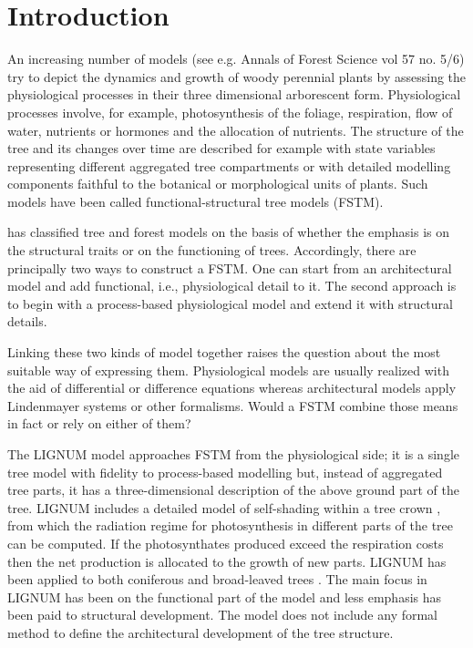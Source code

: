 \section{Introduction} An increasing number of models (see e.g. Annals
of Forest  Science vol  57 no.   5/6) try to  depict the  dynamics and
growth  of  woody  perennial  plants by  assessing  the  physiological
processes in their  three dimensional arborescent form.  Physiological
processes  involve,  for   example,  photosynthesis  of  the  foliage,
respiration, flow  of water, nutrients or hormones  and the allocation
of nutrients.  The structure of the tree and its changes over time are
described  for  example with  state  variables representing  different
aggregated  tree compartments  or with  detailed  modelling components
faithful  to the  botanical or  morphological units  of  plants.  Such
models have been called functional-structural tree models (FSTM).

\citet{kurth:94b} has  classified tree and forest models  on the basis
of  whether  the  emphasis is  on  the  structural  traits or  on  the
functioning of trees.  Accordingly,  there are principally two ways to
construct  a  FSTM.   One   can  start  from  an  architectural  model
\citep{jaeger:92,  kurth:94} and  add functional,  i.e., physiological
detail to  it.  The second approach  is to begin with  a process-based
physiological  model \citep{makela:86, landsberg:86,  sievanen:93} and
extend it with structural details.

Linking these  two kinds of  model together raises the  question about
the  most suitable way  of expressing  them. Physiological  models are
usually realized with the  aid of differential or difference equations
\citep{landsberg:86}  whereas architectural  models  apply Lindenmayer
systems  \citep{kurth:99,pp:90}  or  other  formalisms. Would  a  FSTM
combine those means in fact or rely on either of them?

The LIGNUM model approaches FSTM  from the physiological side; it is a
single tree model  \citep{perttunen:96} with fidelity to process-based
modelling  \citep[see  e.g.][]{nikinmaa:92, sievanen:93,  makela:97-1}
but,  instead of  aggregated tree  parts, it  has  a three-dimensional
description of the  above ground part of the  tree.  LIGNUM includes a
detailed    model    of    self-shading    within   a    tree    crown
\citep{perttunen:96,  perttunen:01}, from  which the  radiation regime
for photosynthesis in different parts of the tree can be computed.  If
the photosynthates produced exceed  the respiration costs then the net
production is allocated  to the growth of new  parts.  LIGNUM has been
applied to both coniferous \citep{perttunen:96,lo:99} and broad-leaved
trees \citep{perttunen:01}.  The main focus  in LIGNUM has been on the
functional  part of  the  model and  less  emphasis has  been paid  to
structural development.  The model  does not include any formal method
to define the architectural development of the tree structure.

